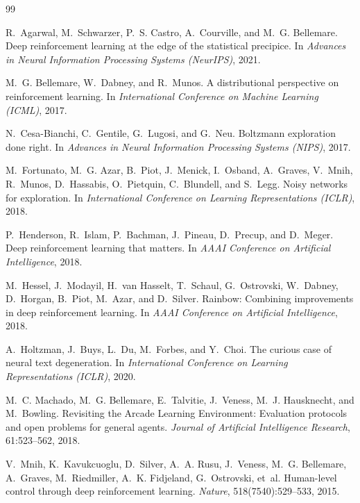 \documentclass[11pt,a4paper]{article}
\begin{document}
\begin{thebibliography}{99}

R.~Agarwal, M.~Schwarzer, P.~S. Castro, A.~Courville, and M.~G. Bellemare.
\newblock Deep reinforcement learning at the edge of the statistical precipice.
\newblock In \emph{Advances in Neural Information Processing Systems (NeurIPS)}, 2021.

M.~G. Bellemare, W.~Dabney, and R.~Munos.
\newblock A distributional perspective on reinforcement learning.
\newblock In \emph{International Conference on Machine Learning (ICML)}, 2017.

N.~Cesa-Bianchi, C.~Gentile, G.~Lugosi, and G.~Neu.
\newblock Boltzmann exploration done right.
\newblock In \emph{Advances in Neural Information Processing Systems (NIPS)}, 2017.

M.~Fortunato, M.~G. Azar, B.~Piot, J.~Menick, I.~Osband, A.~Graves, V.~Mnih,
  R.~Munos, D.~Hassabis, O.~Pietquin, C.~Blundell, and S.~Legg.
\newblock Noisy networks for exploration.
\newblock In \emph{International Conference on Learning Representations (ICLR)}, 2018.

P.~Henderson, R.~Islam, P.~Bachman, J.~Pineau, D.~Precup, and D.~Meger.
\newblock Deep reinforcement learning that matters.
\newblock In \emph{AAAI Conference on Artificial Intelligence}, 2018.

M.~Hessel, J.~Modayil, H.~van Hasselt, T.~Schaul, G.~Ostrovski, W.~Dabney,
  D.~Horgan, B.~Piot, M.~Azar, and D.~Silver.
\newblock Rainbow: Combining improvements in deep reinforcement learning.
\newblock In \emph{AAAI Conference on Artificial Intelligence}, 2018.

A.~Holtzman, J.~Buys, L.~Du, M.~Forbes, and Y.~Choi.
\newblock The curious case of neural text degeneration.
\newblock In \emph{International Conference on Learning Representations (ICLR)}, 2020.

M.~C. Machado, M.~G. Bellemare, E.~Talvitie, J.~Veness, M.~J. Hausknecht, and
  M.~Bowling.
\newblock Revisiting the Arcade Learning Environment: Evaluation protocols and
  open problems for general agents.
\newblock \emph{Journal of Artificial Intelligence Research}, 61:523--562, 2018.

V.~Mnih, K.~Kavukcuoglu, D.~Silver, A.~A. Rusu, J.~Veness, M.~G. Bellemare,
  A.~Graves, M.~Riedmiller, A.~K. Fidjeland, G.~Ostrovski, et~al.
\newblock Human-level control through deep reinforcement learning.
\newblock \emph{Nature}, 518(7540):529--533, 2015.


\end{thebibliography}
\end{document}
